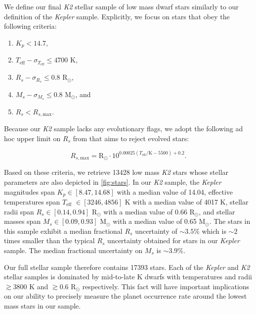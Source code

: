 \documentclass[twocolumn]{emulateapj}
\newcommand{\kepler}[1]{\emph{Kepler}#1}
\newcommand{\ktwo}[1]{\emph{K2}#1}
\newcommand{\teff}[1]{$T_{\text{eff}}$#1}
\begin{document}
We define our final \ktwo{} stellar sample of low mass dwarf stars similarly to our definition of the \kepler{} sample.
Explicitly, we focus on stars that obey the following criteria:

\begin{enumerate}
\item $K_p < 14.7$,
\item $T_{\text{eff}} - \sigma_{T_{\text{eff}}} \leq 4700$ K,
\item $R_s - \sigma_{R_s} \leq 0.8$ R$_{\odot}$,
\item $M_s - \sigma_{M_s} \leq 0.8$ M$_{\odot}$, and
\item $R_s < R_{s,\text{max}}$.
\end{enumerate}

\noindent Because our \ktwo{} sample lacks any evolutionary flags, we adopt the following ad hoc upper limit on $R_s$
from \cite{fulton17} that aims to reject evolved stars:

\begin{equation}
  R_{s,\text{max}} = \text{R}_{\odot} \cdot 10^{0.00025(T_{\text{eff}}/\text{K}-5500)+0.2}.
\end{equation}

\noindent Based on these criteria, we retrieve 13428 low mass \ktwo{} stars whose
stellar parameters are also depicted in \autoref{fig:stars}.
In our \ktwo{} sample, the \kepler{} magnitudes span $K_p \in [8.47, 14.68]$ with a median value of 14.04,
effective temperatures span \teff{} $\in [3246, 4856]$ K with a median value of 4017 K,
stellar radii span $R_s \in [0.14, 0.94]$ R$_{\odot}$ with a median value of 0.66 R$_{\odot}$, and
stellar masses span $M_s \in [0.09, 0.93]$ M$_{\odot}$ with a median value of 0.65 M$_{\odot}$.
The stars in this sample exhibit a median fractional $R_s$ uncertainty of $\sim 3.5$\% which is $\sim 2$
times smaller than the typical $R_s$ uncertainty obtained for stars in our \kepler{} sample.
The median fractional uncertainty on $M_s$ is $\sim 3.9$\%.

Our full stellar sample therefore contains 17393 stars.
Each of the \kepler{} and \ktwo{} stellar samples is dominated by mid-to-late K dwarfs
with temperatures and radii $\gtrsim 3800$ K and $\gtrsim 0.6$ R$_{\odot}$ respectively. This
fact will have important implications on our ability to precisely measure the planet occurrence
rate around the lowest mass stars in our sample.
\end{document}
